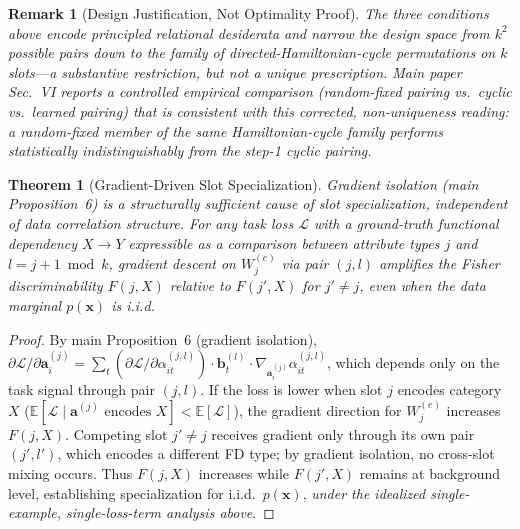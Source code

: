 \documentclass[conference]{IEEEtran}
\newtheorem{theorem}{Theorem}
\newtheorem{remark}{Remark}
\begin{document}
\begin{remark}[Design Justification, Not Optimality Proof]
The three conditions above encode principled relational desiderata and narrow the design space from $k^2$ possible pairs down to the family of directed-Hamiltonian-cycle permutations on $k$ slots---a substantive restriction, but not a unique prescription. Main paper Sec.~VI reports a controlled empirical comparison (random-fixed pairing vs.\ cyclic vs.\ learned pairing) that is consistent with this corrected, non-uniqueness reading: a random-fixed member of the same Hamiltonian-cycle family performs statistically indistinguishably from the step-1 cyclic pairing.
\end{remark}

\begin{theorem}[Gradient-Driven Slot Specialization]
\label{thm:app2}
Gradient isolation (main Proposition~6) is a structurally sufficient cause of slot specialization, independent of data correlation structure. For any task loss $\mathcal{L}$ with a ground-truth functional dependency $X \to Y$ expressible as a comparison between attribute types $j$ and $l{=}j{+}1\bmod k$, gradient descent on $W_j^{(e)}$ via pair $(j, l)$ amplifies the Fisher discriminability $F(j, X)$ relative to $F(j', X)$ for $j' \neq j$, even when the data marginal $p(\mathbf{x})$ is i.i.d.
\end{theorem}
\begin{proof}
	\renewcommand{\qedsymbol}{}
By main Proposition~6 (gradient isolation), $\partial\mathcal{L}/\partial\mathbf{a}_i^{(j)} = \sum_t(\partial\mathcal{L}/\partial\alpha_{it}^{(j,l)}) \cdot \mathbf{b}_t^{(l)} \cdot \nabla_{\mathbf{a}_i^{(j)}}\alpha_{it}^{(j,l)}$, which depends only on the task signal through pair $(j, l)$. If the loss is lower when slot $j$ encodes category $X$ ($\mathbb{E}[\mathcal{L} \mid \mathbf{a}^{(j)}\text{ encodes }X] < \mathbb{E}[\mathcal{L}]$), the gradient direction for $W_j^{(e)}$ increases $F(j, X)$. Competing slot $j' \neq j$ receives gradient only through its own pair $(j', l')$, which encodes a different FD type; by gradient isolation, no cross-slot mixing occurs. Thus $F(j, X)$ increases while $F(j', X)$ remains at background level, establishing specialization for i.i.d.\ $p(\mathbf{x})$, \emph{under the idealized single-example, single-loss-term analysis above}.
\end{proof}
\end{document}
